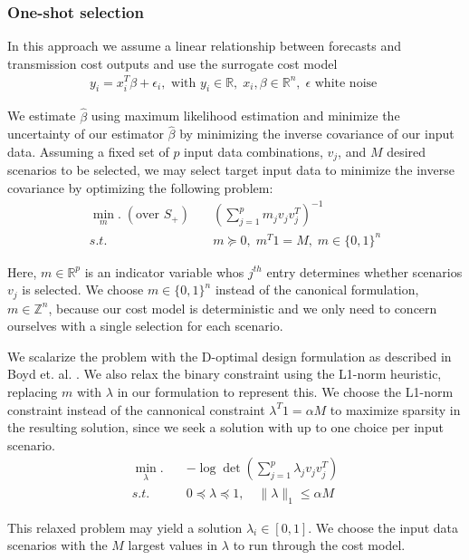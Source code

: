 \documentclass[10pt,twocolumn,letterpaper]{article}
\begin{document}
\subsubsection{One-shot selection}
In this approach we assume a linear relationship between forecasts and transmission cost outputs and use the surrogate cost model 
\begin{align*}
    y_i = x_i^T\beta + \epsilon_i, \text{ with } y_i \in \mathbb{R}, \; x_i, \beta \in \mathbb{R}^n, \; \epsilon \text{ white noise }
\end{align*} 

We estimate $\hat{\beta}$ using maximum likelihood estimation and minimize the uncertainty of our estimator $\hat{\beta}$ by minimizing the inverse covariance of our input data. Assuming a fixed set of $p$ input data combinations, $v_j$, and $M$ desired scenarios to be selected, we may select target input data to minimize the inverse covariance by optimizing the following problem:
\begin{align*}
\min_m. \; (\textrm{over } S_+) \quad & \left(\sum_{j=1}^pm_jv_jv_j^T\right)^{-1}\\
s.t. \quad & m \succeq 0, \; m^T1 = M, \; m \in \{0, 1\}^n
\end{align*}

Here, $m\in \mathbb{R}^p$ is an indicator variable whos $j^{th}$ entry determines whether scenarios $v_j$ is selected. We choose $m \in \{0, 1\}^n$ instead of the canonical formulation, $m \in \mathbb{Z}^n$, because our cost model is deterministic and we only need to concern ourselves with a single selection for each scenario.

We scalarize the problem with the D-optimal design formulation as described in Boyd et. al. \cite{boyd}. We also relax the binary constraint using the L1-norm heuristic, replacing $m$ with $\lambda$ in our formulation to represent this. We choose the L1-norm constraint instead of the cannonical constraint $\lambda^T1 = \alpha M$ to maximize sparsity in the resulting solution, since we seek a solution with up to one choice per input scenario. 
\begin{align*}
    \min_\lambda. \quad & -\log\det \left(\sum_{j=1}^p\lambda_jv_jv_j^T\right)\\
    s.t. \quad & 0 \preceq \lambda \preceq 1, \quad \lVert\lambda\rVert _1 \leq \alpha M
\end{align*}

This relaxed problem may yield a solution $\lambda_i \in [0, 1]$. We choose the input data scenarios with the $M$ largest values in $\lambda$ to run through the cost model.
\end{document}
